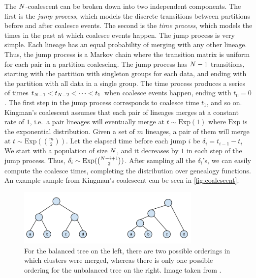 The $N$-coalescent
can be broken down into two
independent components.
The first is the \emph{jump process},
which models the discrete transitions
between partitions
before and after coalesce events.
The second is the \emph{time process},
which models the times in the past
at which coalesce events happen.
The jump process is very simple.
Each lineage has an equal probability of merging
with any other lineage. Thus, the
jump process is a Markov chain
where the transition matrix is uniform
for each pair in a partition coalescing.
The jump process has $N - 1$ transitions, starting
with the partition with singleton groups
for each data, and ending with the
partition with all data in a single group.
The time process produces a series of times
$t_{N - 1} < t_{N - 2} < \cdots <  t_1$ when coalesce events happen,
ending with $t_0 = 0$.
The first step in the jump process
corresponds to coalesce time $t_1$, and so on.
Kingman's coalescent assumes
that each pair of lineages merges at a constant rate of $1$,
i.e.\
a pair lineages will eventually merge at
$t \sim \text{Exp}(1)$ where $\text{Exp}$ is the exponential distribution.
Given a set of $m$ lineages,
a pair of them will merge at
$t \sim \text{Exp}(\binom{m}{2})$.
Let the elapsed time before each jump $i$ be
$\delta_i = t_{i - 1} - t_i$
We start with a population of size $N$,
and it decreases by $1$
in each step of the jump process.
Thus, $\delta_i \sim \text{Exp}(\binom{N - i + 1}{2})$.
After sampling all the $\delta_i$'s, we can easily
compute the coalesce times,
completing the distribution over genealogy functions.
An example sample from Kingman's coalescent can be
seen in \autoref{fig:coalescent}.

\begin{figure}[H]
  \centering
  \includegraphics[width=0.8\textwidth]{img/trees/balanced}
  \caption{For the balanced tree on the left, there are two
  possible orderings in which clusters were merged, whereas there is only one possible ordering for the unbalanced tree on the right. Image taken from \citet{Boyles2012}.}
\label{fig:balanced}
\end{figure}


